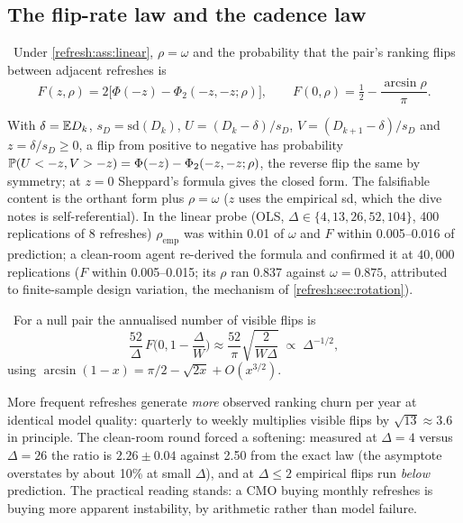 \subsection{The flip-rate law and the cadence law}

\begin{law}
\label{refresh:law:flip}
\tagEstablished\ Under \cref{refresh:ass:linear}, $\rho = \omega$ and the probability that the pair's ranking flips between adjacent refreshes is
\begin{equation}
F(z, \rho) = 2\big[\Phi(-z) - \Phi_2(-z, -z; \rho)\big],
\qquad
F(0, \rho) = \tfrac12 - \frac{\arcsin\rho}{\pi}.
\label{eq:refresh:F}
\end{equation}
\end{law}

With $\delta = \mathbb{E} D_k$, $s_D = \mathrm{sd}(D_k)$, $U = (D_k - \delta)/s_D$, $V = (D_{k+1} - \delta)/s_D$ and $z = \delta/s_D \ge 0$, a flip from positive to negative has probability $\mathbb{P}(U < -z, V > -z) = \Phi(-z) - \Phi_2(-z, -z; \rho)$, the reverse flip the same by symmetry; at $z = 0$ Sheppard's formula gives the closed form. The falsifiable content is the orthant form plus $\rho = \omega$ ($z$ uses the empirical sd, which the dive notes is self-referential). In the linear probe (OLS, $\Delta \in \{4, 13, 26, 52, 104\}$, 400 replications of 8 refreshes) $\rho_{\mathrm{emp}}$ was within 0.01 of $\omega$ and $F$ within 0.005--0.016 of prediction; a clean-room agent re-derived the formula and confirmed it at $40{,}000$ replications ($F$ within 0.005--0.015; its $\rho$ ran 0.837 against $\omega = 0.875$, attributed to finite-sample design variation, the mechanism of \cref{refresh:sec:rotation}).

\begin{corollary}
\label{refresh:cor:cadence}
\tagEstablished\ For a null pair the annualised number of visible flips is
\begin{equation}
\frac{52}{\Delta}\,F\Big(0, 1 - \frac{\Delta}{W}\Big) \approx \frac{52}{\pi}\sqrt{\frac{2}{W\Delta}} \;\propto\; \Delta^{-1/2},
\label{eq:refresh:cadence}
\end{equation}
using $\arcsin(1 - x) = \pi/2 - \sqrt{2x} + O(x^{3/2})$.
\end{corollary}

More frequent refreshes generate \emph{more} observed ranking churn per year at identical model quality: quarterly to weekly multiplies visible flips by $\sqrt{13} \approx 3.6$ in principle. The clean-room round forced a softening: measured at $\Delta = 4$ versus $\Delta = 26$ the ratio is $2.26 \pm 0.04$ against 2.50 from the exact law (the asymptote overstates by about 10\% at small $\Delta$), and at $\Delta \le 2$ empirical flips run \emph{below} prediction. The practical reading stands: a CMO buying monthly refreshes is buying more apparent instability, by arithmetic rather than model failure.

